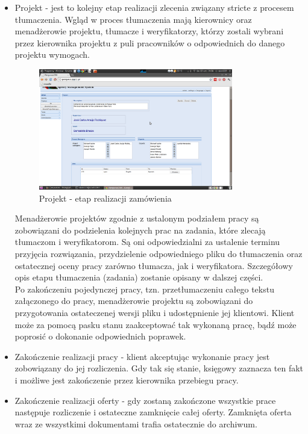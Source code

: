 \documentclass[licencjacka]{pracamgr}
\begin{document}
\begin{itemize}
\item Projekt - jest to kolejny etap realizacji zlecenia związany stricte z procesem tłumaczenia. Wgląd w proces tłumaczenia mają kierownicy oraz menadżerowie projektu, tłumacze i weryfikatorzy, którzy zostali wybrani przez kierownika projektu z puli pracowników o odpowiednich do danego projektu wymogach.
\begin{figure}[ht!]
\centering
\includegraphics[width=0.8\textwidth]{resources/project.png}
\caption{Projekt - etap realizacji zamówienia}
\end{figure}
 
Menadżerowie projektów zgodnie z ustalonym podziałem pracy są zobowiązani do podzielenia kolejnych prac na zadania, które zlecają tłumaczom i weryfikatorom. Są oni odpowiedzialni za ustalenie terminu przyjęcia rozwiązania, przydzielenie odpowiedniego pliku do tłumaczenia oraz ostatecznej oceny pracy zarówno tłumacza, jak i weryfikatora. Szczegółowy opis etapu tłumaczenia (zadania) zostanie opisany w dalszej części.\\
Po zakończeniu pojedynczej pracy, tzn. przetłumaczeniu całego tekstu załączonego do pracy, menadżerowie projektu są zobowiązani do przygotowania ostateczenej wersji pliku i udostępnienie jej klientowi. Klient może za pomocą pasku stanu zaakceptować tak wykonaną pracę, bądź może poprosić o dokonanie odpowiednich poprawek.

\item Zakończenie realizacji pracy - klient akceptując wykonanie pracy jest zobowiązany do jej rozliczenia. Gdy tak się stanie, księgowy zaznacza ten fakt i możliwe jest zakończenie przez kierownika przebiegu pracy.
 
\item Zakończenie realizacji oferty - gdy zostaną zakończone wszystkie prace następuje rozliczenie i ostateczne zamknięcie całej oferty. Zamknięta oferta wraz ze wszystkimi dokumentami trafia ostatecznie do archiwum. 
\end{itemize}  
\end{document}
